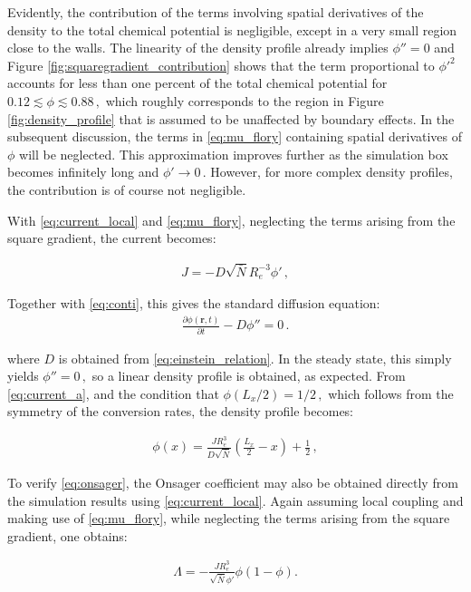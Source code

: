 \documentclass[bachelor,       %
               twoside,        %
               BCOR10mm,       %
               ngerman, english %
               ]{GAUBM}
\begin{document}
Evidently, the contribution of the terms involving spatial derivatives of the density to the total chemical potential is negligible, except in a very small region close to the walls. The linearity of the density profile already implies $\phi''=0$ and Figure \ref{fig:squaregradient_contribution} shows that the term proportional to $\phi'^2$ accounts for less than one percent of the total chemical potential for $0.12\lesssim\phi\lesssim 0.88\,,$ which roughly corresponds to the region in Figure \ref{fig:density_profile} that is assumed to be unaffected by boundary effects. In the subsequent discussion, the terms in \eqref{eq:mu_flory} containing spatial derivatives of $\phi$ will be neglected. This approximation improves further as the simulation box becomes infinitely long and $\phi'\rightarrow 0\,.$ However, for more complex density profiles, the contribution is of course not negligible.

With \eqref{eq:current_local} and \eqref{eq:mu_flory}, neglecting the terms arising from the square gradient, the current becomes:


\begin{align}
  J=-D\sqrt{\bar N}R_e^{-3}\phi'\,,
  \label{eq:current_a}
\end{align}


Together with \eqref{eq:conti}, this gives the standard diffusion equation:
\begin{align}
  \frac{\partial\phi(\mathbf r, t)}{\partial t}-D \phi''=0\,.
  \label{eq:diffusion}
\end{align}

where $D$ is obtained from \eqref{eq:einstein_relation}. In the steady state, this simply yields $\phi''=0\,,$ so a linear density profile is obtained, as expected. From \eqref{eq:current_a}, and the condition that $\phi(L_x/2)=1/2\,,$ which follows from the symmetry of the conversion rates, the density profile becomes:

\begin{align}
  \phi(x)=\frac{JR_e^3}{D\sqrt{\bar{N}}}\left(\frac{L_x}{2}-x\right) + \frac{1}{2}\,,
  \label{eq:density_profile_ana}
\end{align}


To verify \eqref{eq:onsager}, the Onsager coefficient may also be obtained directly from the simulation results using \eqref{eq:current_local}. Again assuming local coupling and making use of \eqref{eq:mu_flory}, while neglecting the terms arising from the square gradient, one obtains:

\begin{align}
  \Lambda=-\frac{JR_e^3}{\sqrt{\bar N}\phi'}\phi(1-\phi).
  \label{eq:onsager_num}
\end{align}
\end{document}
